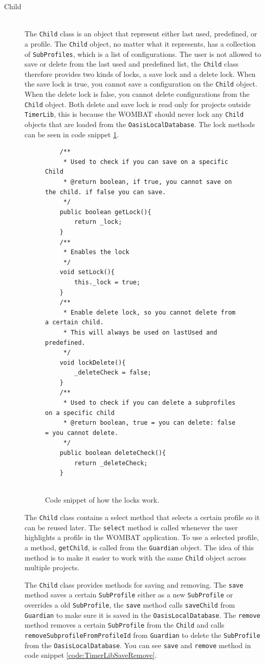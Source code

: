\begin{description}
  \item[Child] \hfill \\
The \texttt{Child} class is an object that represent either last used, predefined, or a profile. The \texttt{Child} object, no matter what it represents, has a collection of \texttt{SubProfiles}, which is a list of configurations. The user is not allowed to save or delete from the last used and predefined list, the \texttt{Child} class therefore provides two kinds of locks, a save lock and a delete lock. When the save lock is true, you cannot save a configuration on the \texttt{Child} object. When the delete lock is false, you cannot delete configurations from the \texttt{Child} object. Both delete and save lock is read only for projects outside \texttt{TimerLib}, this is because the WOMBAT should never lock any \texttt{Child} objects that are loaded from the \texttt{OasisLocalDatabase}. The lock methods can be seen in code snippet \ref{code:TimerLibLocks}.

		\begin{figure}[H]
\begin{lstlisting}
	/**
	 * Used to check if you can save on a specific Child
	 * @return boolean, if true, you cannot save on the child. if false you can save.
	 */
	public boolean getLock(){
		return _lock;
	}
	/**
	 * Enables the lock
	 */
	void setLock(){
		this._lock = true;
	}
	/**
	 * Enable delete lock, so you cannot delete from a certain child.
	 * This will always be used on lastUsed and predefined.
	 */
	void lockDelete(){
		_deleteCheck = false;
	}
	/**
	 * Used to check if you can delete a subprofiles on a specific child
	 * @return boolean, true = you can delete: false = you cannot delete.
	 */
	public boolean deleteCheck(){
		return _deleteCheck;
	}
	
\end{lstlisting}
\caption{Code snippet of how the locks work.}%
\label{code:TimerLibLocks}%
\end{figure}
	
The \texttt{Child} class contains a select method that selects a certain profile so it can be reused later. The \texttt{select} method is called whenever the user highlights a profile in the WOMBAT application. To use a selected profile, a method, \texttt{getChild}, is called from the \texttt{Guardian} object. The idea of this method is to make it easier to work with the same \texttt{Child} object across multiple projects.

The \texttt{Child} class provides methods for saving and removing. The \texttt{save} method saves a certain \texttt{SubProfile} either as a new \texttt{SubProfile} or overrides a old \texttt{SubProfile}, the \texttt{save} method calls \texttt{saveChild} from \texttt{Guardian} to make sure it is saved in the \texttt{OasisLocalDatabase}. The \texttt{remove} method removes a certain \texttt{SubProfile} from the \texttt{Child} and calls \texttt{removeSubprofileFromProfileId} from \texttt{Guardian} to delete the \texttt{SubProfile} from the \texttt{OasisLocalDatabase}. You can see \texttt{save} and \texttt{remove} method in code snippet \ref{code:TimerLibSaveRemove}. 
	

\end{description}
